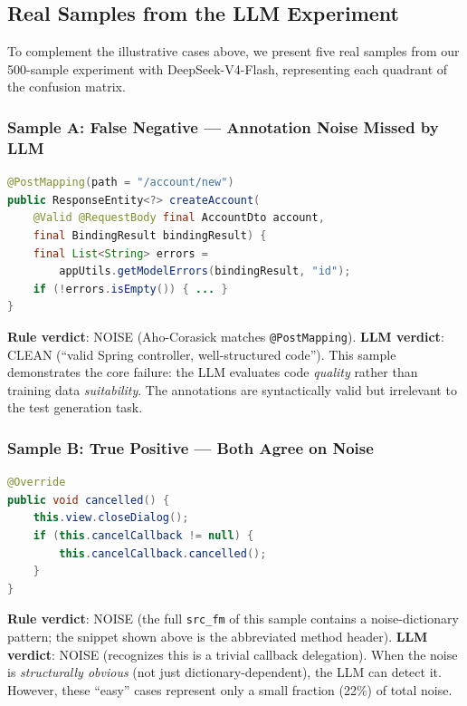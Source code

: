 \documentclass[acmlarge,nonacm,screen]{acmart}
\begin{document}
\subsection{Real Samples from the LLM Experiment}

To complement the illustrative cases above, we present five real samples from our 500-sample experiment with DeepSeek-V4-Flash, representing each quadrant of the confusion matrix.

\subsubsection{Sample A: False Negative --- Annotation Noise Missed by LLM}

\begin{lstlisting}[language=Java,caption={Real sample: LLM classifies as CLEAN, rules correctly flag as NOISE}]
@PostMapping(path = "/account/new")
public ResponseEntity<?> createAccount(
    @Valid @RequestBody final AccountDto account,
    final BindingResult bindingResult) {
    final List<String> errors =
        appUtils.getModelErrors(bindingResult, "id");
    if (!errors.isEmpty()) { ... }
}
\end{lstlisting}

\textbf{Rule verdict}: NOISE (Aho-Corasick matches \texttt{@PostMapping}). \textbf{LLM verdict}: CLEAN (``valid Spring controller, well-structured code''). This sample demonstrates the core failure: the LLM evaluates code \textit{quality} rather than training data \textit{suitability}. The annotations are syntactically valid but irrelevant to the test generation task.

\subsubsection{Sample B: True Positive --- Both Agree on Noise}

\begin{lstlisting}[language=Java,caption={Real sample: Both rule and LLM agree this is noise}]
@Override
public void cancelled() {
    this.view.closeDialog();
    if (this.cancelCallback != null) {
        this.cancelCallback.cancelled();
    }
}
\end{lstlisting}

\textbf{Rule verdict}: NOISE (the full \texttt{src\_fm} of this sample contains a noise-dictionary pattern; the snippet shown above is the abbreviated method header). \textbf{LLM verdict}: NOISE (recognizes this is a trivial callback delegation). When the noise is \textit{structurally obvious} (not just dictionary-dependent), the LLM can detect it. However, these ``easy'' cases represent only a small fraction (22\%) of total noise.
\end{document}
